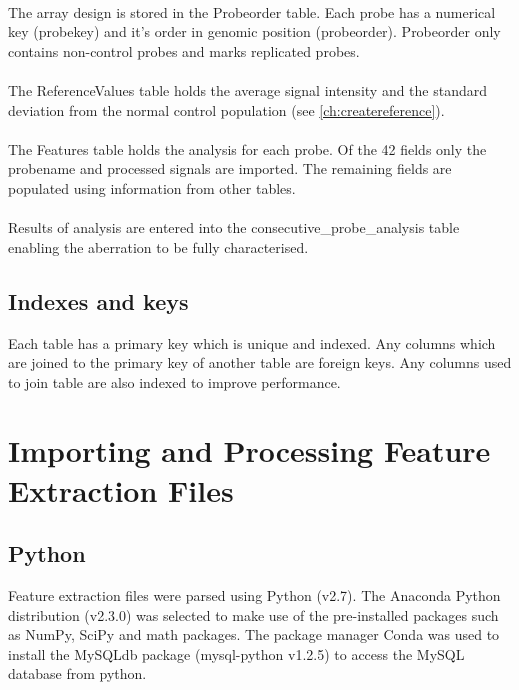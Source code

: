 \paragraph*{}
The array design is stored in the Probeorder table. Each probe has a numerical key (probekey) and it's order in genomic position (probeorder). Probeorder only contains non-control probes and marks replicated probes.
\paragraph*{}
The ReferenceValues table holds the average signal intensity and the standard deviation from the normal control population (see \ref{ch:createreference}).
\paragraph*{}
The Features table holds the analysis for each probe. Of the 42 fields only the probename and processed signals are imported. The remaining fields are populated using information from other tables.
\paragraph*{}
Results of analysis are entered into the consecutive\_probe\_analysis table enabling the aberration to be fully characterised.

\subsection{Indexes and keys}
Each table has a primary key which is unique and indexed. 
Any columns which are joined to the primary key of another table are foreign keys.
Any columns used to join table are also indexed to improve performance.

\section{Importing and Processing Feature Extraction Files}
\subsection{Python}
Feature extraction files were parsed using Python (v2.7)\cite{python_software_foundation_python_2010}. The Anaconda Python distribution (v2.3.0) \cite{continuum_why_2016} was selected to make use of the pre-installed packages such as NumPy, SciPy and math packages. The package manager Conda was used to install the MySQLdb package (mysql-python v1.2.5)\cite{dustman2014} to access the MySQL database from python. 
